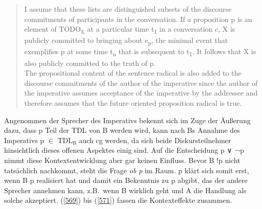 \begin{quotation}
I assume that these lists are distinguished subsets of the discourse commitments of participants in the conversation. If a proposition p is an element of $\textrm{TODO}_{\textrm{X}}$ at a particular time t\textsubscript{1} in a conversation c, X is publicly committed to bringing about e\textsubscript{p}, the minimal event that exemplifies p at some time t\textsubscript{n} that is subsequent to t\textsubscript{1}. It follows that X is also publicly committed to the truth of p.\\
\newline
The propositional content of the sentence radical is also added to the discourse commitments of the author of the imperative since the author of the imperative assumes acceptance of the imperative by the addressee and therefore assumes that the future oriented proposition radical is true.
\end{quotation}
Angenommen der Sprecher des Imperativs bekennt sich im Zuge der Äußerung dazu, dass p Teil der TDL von B werden wird, kann nach Bs Annahme des Imperativs p $\in$ $\textrm{TDL}_{\textrm{B}}$ auch cg werden, da sich beide Diskursteilnehmer hinsichtlich dieses offenen Aspektes einig sind. Auf die Entscheidung p ∨ ¬p nimmt diese Kontextentwicklung aber gar keinen Einfluss. Bevor B !p nicht tatsächlich nach\-kommt, steht die Frage \textit{ob p} im Raum. p klärt sich somit erst, wenn B p realisiert hat und damit ein Bekenntnis zu p abgibt, das der andere Sprecher annehmen kann, z.B.\ wenn B wirklich geht und A die Handlung als solche akzeptiert. (\ref{569}) bis (\ref{571}) fassen die Kontexteffekte zusammen.

